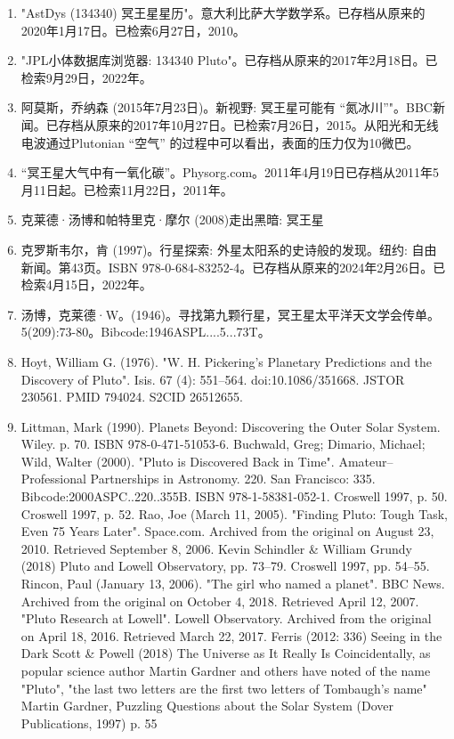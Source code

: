 \begin{enumerate}
\item "AstDys (134340) 冥王星星历"。意大利比萨大学数学系。已存档从原来的2020年1月17日。已检索6月27日，2010。
\item "JPL小体数据库浏览器: 134340 Pluto"。已存档从原来的2017年2月18日。已检索9月29日，2022年。
\item 阿莫斯，乔纳森 (2015年7月23日)。新视野: 冥王星可能有 “氮冰川”"。BBC新闻。已存档从原来的2017年10月27日。已检索7月26日，2015。从阳光和无线电波通过Plutonian “空气” 的过程中可以看出，表面的压力仅为10微巴。
\item “冥王星大气中有一氧化碳”。Physorg.com。2011年4月19日已存档从2011年5月11日起。已检索11月22日，2011年。
\item 克莱德·汤博和帕特里克·摩尔 (2008)走出黑暗: 冥王星
\item 克罗斯韦尔，肯 (1997)。行星探索: 外星太阳系的史诗般的发现。纽约: 自由新闻。第43页。ISBN 978-0-684-83252-4。已存档从原来的2024年2月26日。已检索4月15日，2022年。
\item 汤博，克莱德·W。(1946)。寻找第九颗行星，冥王星太平洋天文学会传单。5(209):73-80。Bibcode:1946ASPL....5...73T。
\item Hoyt, William G. (1976). "W. H. Pickering's Planetary Predictions and the Discovery of Pluto". Isis. 67 (4): 551–564. doi:10.1086/351668. JSTOR 230561. PMID 794024. S2CID 26512655.
\item Littman, Mark (1990). Planets Beyond: Discovering the Outer Solar System. Wiley. p. 70. ISBN 978-0-471-51053-6.
 Buchwald, Greg; Dimario, Michael; Wild, Walter (2000). "Pluto is Discovered Back in Time". Amateur–Professional Partnerships in Astronomy. 220. San Francisco: 335. Bibcode:2000ASPC..220..355B. ISBN 978-1-58381-052-1.
 Croswell 1997, p. 50.
 Croswell 1997, p. 52.
 Rao, Joe (March 11, 2005). "Finding Pluto: Tough Task, Even 75 Years Later". Space.com. Archived from the original on August 23, 2010. Retrieved September 8, 2006.
 Kevin Schindler & William Grundy (2018) Pluto and Lowell Observatory, pp. 73–79.
 Croswell 1997, pp. 54–55.
 Rincon, Paul (January 13, 2006). "The girl who named a planet". BBC News. Archived from the original on October 4, 2018. Retrieved April 12, 2007.
 "Pluto Research at Lowell". Lowell Observatory. Archived from the original on April 18, 2016. Retrieved March 22, 2017.
 Ferris (2012: 336) Seeing in the Dark
 Scott & Powell (2018) The Universe as It Really Is
 Coincidentally, as popular science author Martin Gardner and others have noted of the name "Pluto", "the last two letters are the first two letters of Tombaugh's name" Martin Gardner, Puzzling Questions about the Solar System (Dover Publications, 1997) p. 55

\end{enumerate}
